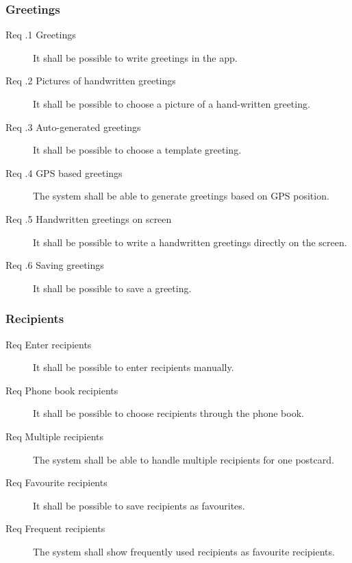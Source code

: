 \documentclass[10pt,a4paper]{article}
\begin{document}
\subsubsection{Greetings}
\begin{description}
\item [Req \thesubsubsection .1 Greetings] It shall be possible to write greetings in the app.
\item [Req \thesubsubsection .2 Pictures of handwritten greetings] It shall be possible to choose a picture of a hand-written greeting.
\item [Req \thesubsubsection .3 Auto-generated greetings] It shall be possible to choose a template greeting.
\item [Req \thesubsubsection .4 GPS based greetings] The system shall be able to generate greetings based on GPS position. 
\item [Req \thesubsubsection .5 Handwritten greetings on screen] It shall be possible to write a handwritten greetings directly on the screen.
\item [Req \thesubsubsection .6 Saving greetings] It shall be possible to save a greeting.
\end{description}

\subsubsection{Recipients}
\begin{description}
\item [Req  Enter recipients] It shall be possible to enter recipients manually.
\item [Req  Phone book recipients] It shall be possible to choose recipients through the phone book.
\item [Req  Multiple recipients] The system shall be able to handle multiple recipients for one postcard.
\item [Req  Favourite recipients] It shall be possible to save recipients as favourites.
\item [Req  Frequent recipients] The system shall show frequently used recipients as favourite recipients.
\end{description}
\end{document}
